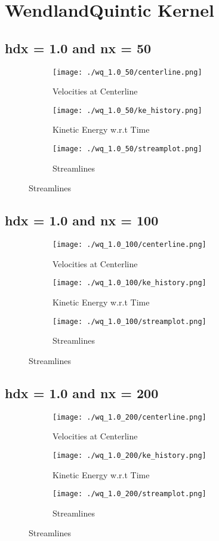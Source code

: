 \documentclass[12pt, a4paper]{report}
\begin{document}
\section{WendlandQuintic Kernel}
\subsection{hdx = 1.0 and nx = 50}
\begin{figure}[H]
\begin{subfigure}{0.5\textwidth}
	\texttt{[image: ./wq\_1.0\_50/centerline.png]}
	\caption{Velocities at Centerline}
\end{subfigure}
\begin{subfigure}{0.5\textwidth}
	\texttt{[image: ./wq\_1.0\_50/ke\_history.png]}
	\caption{Kinetic Energy w.r.t Time}
\end{subfigure}
\medskip
\begin{subfigure}{\textwidth}
	\centering
	\texttt{[image: ./wq\_1.0\_50/streamplot.png]}
	\caption{Streamlines}
\end{subfigure}
\end{figure}

\subsection{hdx = 1.0 and nx = 100}
\begin{figure}[H]
\begin{subfigure}{0.5\textwidth}
	\texttt{[image: ./wq\_1.0\_100/centerline.png]}
	\caption{Velocities at Centerline}
\end{subfigure}
\begin{subfigure}{0.5\textwidth}
	\texttt{[image: ./wq\_1.0\_100/ke\_history.png]}
	\caption{Kinetic Energy w.r.t Time}
\end{subfigure}
\medskip
\begin{subfigure}{\textwidth}
	\texttt{[image: ./wq\_1.0\_100/streamplot.png]}
	\caption{Streamlines}
\end{subfigure}
\end{figure}

\subsection{hdx = 1.0 and nx = 200}
\begin{figure}[H]
\begin{subfigure}{0.5\textwidth}
	\texttt{[image: ./wq\_1.0\_200/centerline.png]}
	\caption{Velocities at Centerline}
\end{subfigure}
\begin{subfigure}{0.5\textwidth}
	\texttt{[image: ./wq\_1.0\_200/ke\_history.png]}
	\caption{Kinetic Energy w.r.t Time}
\end{subfigure}
\medskip
\begin{subfigure}{\textwidth}
	\texttt{[image: ./wq\_1.0\_200/streamplot.png]}
	\caption{Streamlines}
\end{subfigure}
\end{figure}
\end{document}
